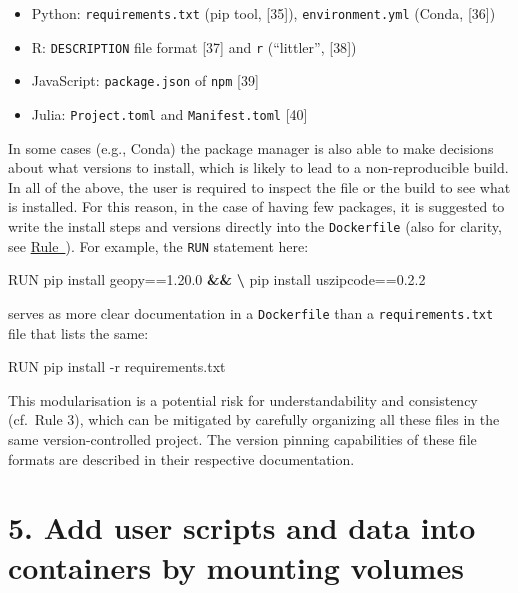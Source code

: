 \documentclass[10pt,letterpaper]{article}
\newenvironment{Shaded}{\begin{snugshade}}{\end{snugshade}}
\newcommand{\ExtensionTok}[1]{#1}
\newcommand{\KeywordTok}[1]{\textcolor[rgb]{0.13,0.29,0.53}{\textbf{#1}}}
\newcommand{\NormalTok}[1]{#1}
\providecommand{\tightlist}{%
  \setlength{\itemsep}{0pt}\setlength{\parskip}{0pt}}
\begin{document}
\begin{itemize}
\tightlist
\item
  Python: \texttt{requirements.txt} (pip tool, {[}35{]}),
  \texttt{environment.yml} (Conda, {[}36{]})
\item
  R: \texttt{DESCRIPTION} file format {[}37{]} and \texttt{r}
  (``littler'', {[}38{]})
\item
  JavaScript: \texttt{package.json} of \texttt{npm} {[}39{]}
\item
  Julia: \texttt{Project.toml} and \texttt{Manifest.toml} {[}40{]}
\end{itemize}

In some cases (e.g., Conda) the package manager is also able to make
decisions about what versions to install, which is likely to lead to a
non-reproducible build. In all of the above, the user is required to
inspect the file or the build to see what is installed. For this reason,
in the case of having few packages, it is suggested to write the install
steps and versions directly into the \texttt{Dockerfile} (also for
clarity, see
\hyperref[{rule:formatting}]{Rule~}). For
example, the \texttt{RUN} statement here:

\begin{Shaded}
\begin{Highlighting}[]
\ExtensionTok{RUN}\NormalTok{ pip install geopy==1.20.0 }\KeywordTok{&&} \KeywordTok{\textbackslash{}}
    \ExtensionTok{pip}\NormalTok{ install uszipcode==0.2.2}
\end{Highlighting}
\end{Shaded}

serves as more clear documentation in a \texttt{Dockerfile} than a
\texttt{requirements.txt} file that lists the same:

\begin{Shaded}
\begin{Highlighting}[]
\ExtensionTok{RUN}\NormalTok{ pip install -r requirements.txt}
\end{Highlighting}
\end{Shaded}

This modularisation is a potential risk for understandability and
consistency (cf.~Rule 3), which can be mitigated by carefully organizing
all these files in the same version-controlled project. The version
pinning capabilities of these file formats are described in their
respective documentation.

\hypertarget{add-user-scripts-and-data-into-containers-by-mounting-volumes}{%
\section*{5. Add user scripts and data into containers by mounting
volumes}\label{add-user-scripts-and-data-into-containers-by-mounting-volumes}}
\end{document}
